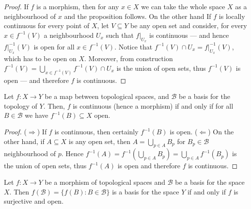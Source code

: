 \begin{proof}
    If \(f\) is a morphism, then for any \(x \in X\) we can take the whole space
    \(X\) as a neighbourhood of \(x\) and the proposition follows. On the other hand
    If \(f\) is locally continuous for every point of \(X\), let \(V \subseteq Y\)
    be any open set and consider, for every \(x \in f^{-1}(V)\) a neighbourhood
    \(U_x\) such that \(f|_{U_x}\) is continuous --- and hence \(f|_{U_x}^{-1}(V)\)
    is open for all \(x \in f^{-1}(V)\). Notice that \(f^{-1}(V) \cap U_x =
    f|_{U_x}^{-1}(V)\), which has to be open on \(X\). Moreover, from construction
    \(f^{-1}(V) = \bigcup_{x \in f^{-1}(V)} f^{-1}(V) \cap U_x\) is the union of
    open sets, thus \(f^{-1}(V)\) is open --- and therefore \(f\) is continuous.
\end{proof}

\begin{proposition}
    Let \(f: X \to Y\) be a map between topological spaces, and \(\mathcal B\) be
    a basis for the topology of \(Y\). Then, \(f\) is continuous (hence a
    morphism) if and only if for all \(B \in \mathcal B\) we have \(f^{-1}(B)
    \subseteq X\) open.
\end{proposition}

\begin{proof}
    (\(\Rightarrow\)) If \(f\) is continuous, then certainly \(f^{-1}(B)\) is
    open. (\(\Leftarrow\)) On the other hand, if \(A \subseteq X\) is any open
    set, then \(A = \bigcup_{p \in A} B_p\) for \(B_p \in \mathcal B\)
    neighbourhood of \(p\). Hence \(f^{-1}(A) = f^{-1} (\bigcup_{p \in A}
    B_p) = \bigcup_{p \in A} f^{-1}(B_p)\) is the union of open sets, thus
    \(f^{-1}(A)\) is open and therefore \(f\) is continuous.
\end{proof}

\begin{proposition}\label{prop: basis image surjective}
    Let \(f: X \to Y\) be a morphism of topological spaces and \(\mathcal B\) be a
    basis for the space \(X\). Then \(f(\mathcal B) = \{f(B) \colon B \in \mathcal
    B\}\) is a basis for the space \(Y\) if and only if \(f\) is surjective and
    open.
\end{proposition}

